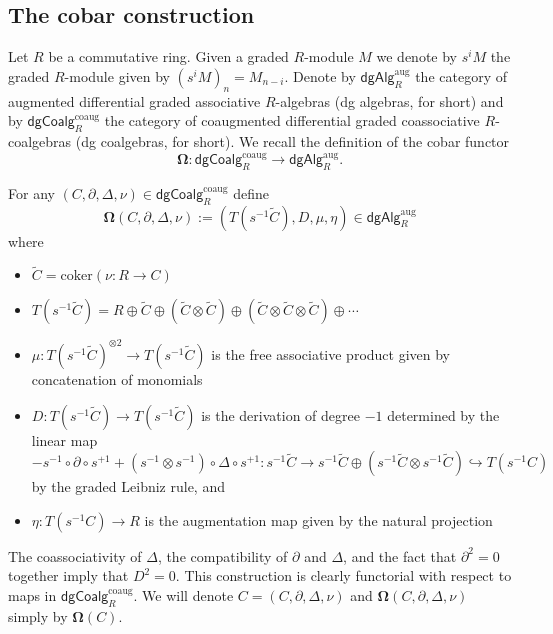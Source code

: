 \subsection{The cobar construction}

Let $R$ be a commutative ring. Given a graded $R$-module $M$ we denote by $s^{i}M$ the graded $R$-module given by $(s^{i}M)_n= M_{n-i}$.
Denote by $\mathsf{dgAlg}^{\text{aug}}_R$ the category of augmented differential graded associative $R$-algebras (dg algebras, for short) and by $\mathsf{dgCoalg}^{\text{coaug}}_R$ the category of coaugmented differential graded coassociative $R$-coalgebras (dg coalgebras, for short). We recall the definition of the cobar functor 
$$\mathbf{\Omega}: \mathsf{dgCoalg}^{\text{coaug}}_R \to \mathsf{dgAlg}^{\text{aug}}_R.$$

For any $(C, \partial, \Delta, \nu)  \in \mathsf{dgCoalg}^{\text{coaug}}_R$ define
$$\mathbf{\Omega}(C, \partial, \Delta, \nu) := ( T(s^{-1}  \widetilde{C} ), D, \mu, \eta) \in \mathsf{dgAlg}^{\text{aug}}_R$$ where 
\begin{itemize}
\item $\widetilde{C}=\text{coker}(\nu: R \to C)$
\item $T(s^{-1} \widetilde{C})= R \oplus \widetilde{C} \oplus (\widetilde{C}  \otimes \widetilde{C} ) \oplus ( \widetilde{C} \otimes \widetilde{C} \otimes \widetilde{C} ) \oplus\cdots $
\item $\mu: T(s^{-1}  \widetilde{C} )^{\otimes 2} \to T(s^{-1}  \widetilde{C} ) $ is the free associative product given by concatenation of monomials
\item $D: T(s^{-1}  \widetilde{C} ) \to T(s^{-1}  \widetilde{C} )$ is the derivation of degree $-1$ determined by the linear map $$- s^{-1} \circ \partial \circ s^{+1} + (s^{-1} \otimes s^{-1}) \circ \Delta \circ s^{+1}: s^{-1}\widetilde{C} \to s^{-1}\widetilde{C} \oplus (s^{-1}\widetilde{C} \otimes s^{-1}\widetilde{C}) \hookrightarrow T(s^{-1}C)$$  by the graded Leibniz rule, and
\item $\eta: T(s^{-1}C) \to R$ is the augmentation map given by the natural projection
\end{itemize}

The coassociativity of $\Delta$, the compatibility of $\partial$ and $\Delta$, and the fact that $\partial^2 =0$ together imply that $D^2=0$. This construction is clearly functorial with respect to maps in $\mathsf{dgCoalg}^{\text{coaug}}_R$. We will denote $C=(C, \partial, \Delta, \nu)$ and $\mathbf{\Omega} (C, \partial, \Delta, \nu)$ simply by $\mathbf{\Omega}(C)$. 

